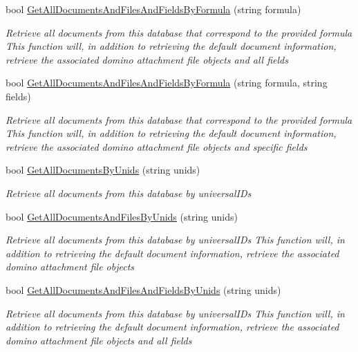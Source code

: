 \begin{DoxyCompactItemize}
bool \mbox{\hyperlink{class_database_object_ae6b850b56e26c6960ec2b7ff4d78372c}{Get\+All\+Documents\+And\+Files\+And\+Fields\+By\+Formula}} (string formula)
\begin{DoxyCompactList}\small\item\em Retrieve all documents from this database that correspond to the provided formula This function will, in addition to retrieving the default document information, retrieve the associated domino attachment file objects and all fields \end{DoxyCompactList}\item 
bool \mbox{\hyperlink{class_database_object_a5f69325c3b09142f2a3a9ae509ef02fa}{Get\+All\+Documents\+And\+Files\+And\+Fields\+By\+Formula}} (string formula, string fields)
\begin{DoxyCompactList}\small\item\em Retrieve all documents from this database that correspond to the provided formula This function will, in addition to retrieving the default document information, retrieve the associated domino attachment file objects and specific fields \end{DoxyCompactList}\item 
bool \mbox{\hyperlink{class_database_object_a4d8a7d73614f53a04fe8eb79bef2f614}{Get\+All\+Documents\+By\+Unids}} (string unids)
\begin{DoxyCompactList}\small\item\em Retrieve all documents from this database by universal\+I\+Ds \end{DoxyCompactList}\item 
bool \mbox{\hyperlink{class_database_object_a9332713c924ab14195fe51bf0b8d35d1}{Get\+All\+Documents\+And\+Files\+By\+Unids}} (string unids)
\begin{DoxyCompactList}\small\item\em Retrieve all documents from this database by universal\+I\+Ds This function will, in addition to retrieving the default document information, retrieve the associated domino attachment file objects \end{DoxyCompactList}\item 
bool \mbox{\hyperlink{class_database_object_a92de6fceafa29d3dcc8d3fff6961e6d6}{Get\+All\+Documents\+And\+Files\+And\+Fields\+By\+Unids}} (string unids)
\begin{DoxyCompactList}\small\item\em Retrieve all documents from this database by universal\+I\+Ds This function will, in addition to retrieving the default document information, retrieve the associated domino attachment file objects and all fields \end{DoxyCompactList}\item 

\end{DoxyCompactItemize}
